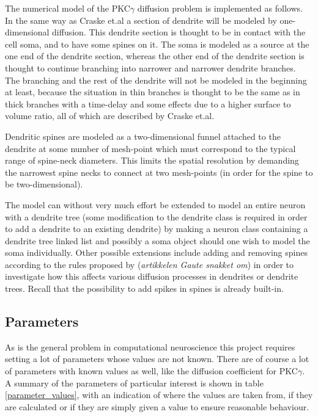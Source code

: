 The numerical model of the PKC$\gamma$ diffusion problem is implemented as follows. 
In the same way as Craske et.al \cite{craske2005spines} a section of dendrite will be modeled by one-dimensional diffusion. 
This dendrite section is thought to be in contact with the cell soma, and to have some spines on it. 
The soma is modeled as a source at the one end of the dendrite section, whereas the other end of the dendrite section is thought to continue branching into narrower and narrower dendrite branches. 
The branching and the rest of the dendrite will not be modeled in the beginning at least, because the situation in thin branches is thought to be the same as in thick branches with a time-delay and some effects due to a higher surface to volume ratio, all of which are described by Craske et.al. 

Dendritic spines are modeled as a two-dimensional funnel attached to the dendrite at some number of mesh-point which must correspond to the typical range of spine-neck diameters. 
This limits the spatial resolution by demanding the narrowest spine necks to connect at two mesh-points (in order for the spine to be two-dimensional). 

The model can without very much effort be extended to model an entire neuron with a dendrite tree (some modification to the dendrite class is required in order to add a dendrite to an existing dendrite) by making a neuron class containing a dendrite tree linked list and possibly a soma object should one wish to model the soma individually. 
Other possible extensions include adding and removing spines according to the rules proposed by (\emph{artikkelen Gaute snakket om}) in order to investigate how this affects various diffusion processes in dendrites or dendrite trees. 
Recall that the possibility to add spikes in spines is already built-in.

\subsection{Parameters}

As is the general problem in computational neuroscience this project requires setting a lot of parameters whose values are not known. 
There are of course a lot of parameters with known values as well, like the diffusion coefficient for PKC$\gamma$. 
A summary of the parameters of particular interest is shown in table \ref{parameter_values}, with an indication of where the values are taken from, if they are calculated or if they are simply given a value to ensure reasonable behaviour.

